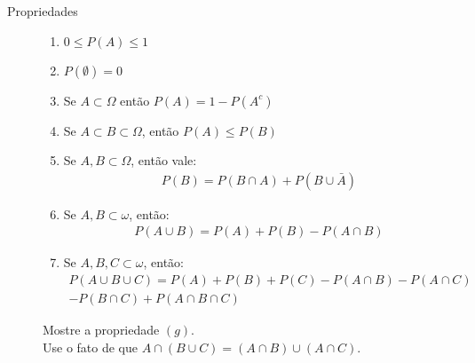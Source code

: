 \begin{description}
  \item[Propriedades]

    \begin{enumerate}[label=(\alph*)]
      \item $0 \le P(A) \le 1$
      \item $P(\emptyset)=0$
      \item Se $A \subset \Omega$ então $P(A)=1-P(A^c)$
      \item Se $A \subset B \subset \Omega$, então $P(A) \le P(B)$
      \item Se $A,B \subset \Omega$, então vale:
        \begin{align}
          P(B)= P(B\cap A)+ P(B\cup \bar{A})
        \end{align}
      \item Se $A,B \subset \omega$, então:
        \begin{align}
          P(A\cup B)= P(A)+P(B)-P(A\cap B)
        \end{align}
      \item Se $A,B,C \subset \omega$, então:
        \begin{align}
          P(A\cup B \cup C)= P(A)+P(B)+P(C)-P(A \cap B)- P(A \cap C) \nonumber\\-
          P(B\cap C)+P(A\cap B \cap C) 
        \end{align}
    \end{enumerate}
    \begin{example} Mostre a propriedade $(g)$. \\Use o fato de que $A\cap (B \cup C )= (A\cap B )\cup (A \cap C )$.


\end{example}
\end{description}
